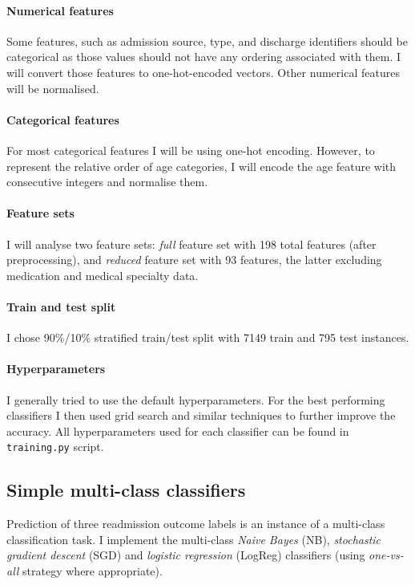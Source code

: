 \documentclass[10pt, twocolumn]{article}
\begin{document}
\paragraph{Numerical features} Some features, such as admission source, type, and discharge identifiers should be categorical as those values should not have any ordering associated with them. I will convert those features to one-hot-encoded vectors. Other numerical features will be normalised.

\paragraph{Categorical features} For most categorical features I will be using one-hot encoding. However, to represent the relative order of age categories, I will encode the age feature with consecutive integers and normalise them.

\paragraph{Feature sets} I will analyse two feature sets: \textit{full} feature set with 198 total features (after preprocessing), and \textit{reduced} feature set with 93 features, the latter excluding medication and medical specialty data. 

\paragraph{Train and test split} I chose 90\%/10\% stratified train/test split with 7149 train and 795 test instances.

\paragraph{Hyperparameters} I generally tried to use the default hyperparameters. For the best performing classifiers I then used grid search and similar techniques to further improve the accuracy. All hyperparameters used for each classifier can be found in \texttt{training.py} script.

\subsection{Simple multi-class classifiers}
Prediction of three readmission outcome labels is an instance of a multi-class classification task. I implement the multi-class \textit{Naive Bayes} (NB), \textit{stochastic gradient descent} (SGD) and \textit{logistic regression}  (LogReg) classifiers (using \textit{one-vs-all} strategy where appropriate).
\end{document}
